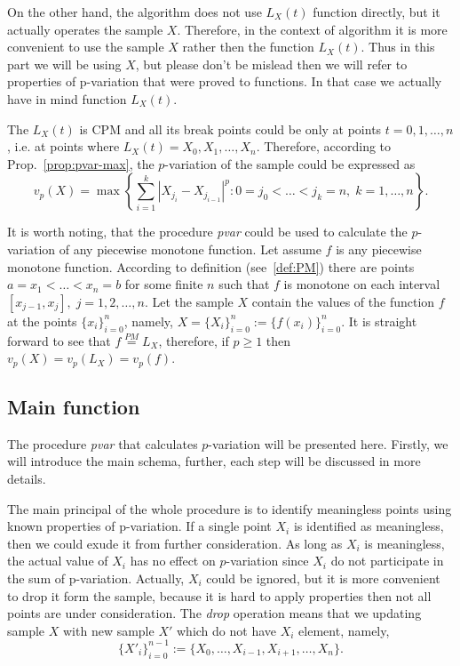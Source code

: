 \documentclass[12pt, a4paper]{article}
\numberwithin{equation}{section}
\begin{document}
On the other hand, the algorithm does not use
$L_X(t)$ function directly, but it actually operates the
sample $X$. Therefore, in the context of algorithm
it is more convenient to use the sample $X$ rather then the function $L_X(t)$. Thus in this part we will be using $X$, but please don't be mislead then we will refer to properties of p-variation 
that were proved to functions. In that case we actually have in mind function $L_X(t)$. 

The $L_X(t)$ is CPM and all its break points could be 
only at points $t=0,1,\dots,n$, i.e. at points where 
 $L_X(t)=X_0,X_1,\dots,X_n$.
Therefore, according to Prop.~\ref{prop:pvar-max},
 the $p$-variation of the sample could be expressed as
\begin{equation}
v_p(X) = \max\left\{ \sum_{i=1}^k |X_{j_i} - X_{j_{i-1}}|^p :
  0=j_0<\dots<j_k=n,\; k=1,\dots,n  \right\}.
\end{equation}


It is worth noting, 
that the procedure \emph{pvar} could be used to calculate
the $p$-variation of any piecewise monotone function.
Let assume $f$ is any piecewise monotone function.  
According to definition (see~\ref{def:PM}) 
there are points $a=x_1<\dots<x_n=b$ for some finite $n$ such 
that $f$ is monotone on each interval $[x_{j-1},x_j],\;j=1,2,\dots,n$.
Let the sample $X$ contain the values of the function $f$ 
at the points $\{x_{i}\}_{i=0}^{n}$, namely,
$X=\{X_{i}\}_{i=0}^{n}:=\{f(x_{i})\}_{i=0}^{n}$.
It is straight forward to see that 
$f \stackrel{PM}{=} L_X$, therefore, if $p \geq 1$ then $v_p(X)=v_p(L_X)=v_p(f)$.


\subsection{Main function}

The procedure \emph{pvar} that calculates
$p$-variation will be presented here. Firstly,
we will introduce the main schema, further, each step will
be discussed in more details. 

The main principal of the whole procedure is to identify 
meaningless points using known properties of p-variation.
If a single point $X_i$ is identified 
as meaningless, then we could exude it from further consideration.
As long as $X_i$ is meaningless, the actual value of 
$X_i$ has no effect on $p$-variation since $X_i$ do not participate 
in the sum of p-variation. Actually, $X_i$ could be ignored,
but it is more convenient to drop it form the sample,
because it is hard to apply properties then not all points are under consideration. 
The \emph{drop} operation means that we 
updating sample $X$ with new sample $X'$ which do not have
$X_i$ element, namely,  
$$
\{X'_{i}\}_{i=0}^{n-1}:=\{X_0,\dots,X_{i-1},X_{i+1},\dots,X_n\}.
$$
\end{document}

